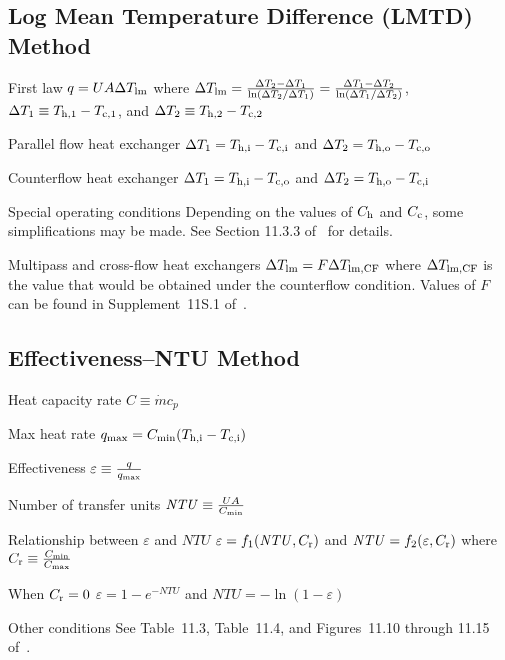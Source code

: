 \documentclass{article}
\begin{document}
\subsection{Log Mean Temperature Difference (LMTD) Method}
\label{sec:lmtd}

\begin{description*}
\item[First law]
  \(q = UA\Delta T_{\mathrm{lm}}\) where
  \(\Delta T_{\mathrm{lm}} = \frac{\Delta T_2 - \Delta T_1}{\ln(\Delta T_2 / \Delta T_1)}
  = \frac{\Delta T_1 - \Delta T_2}{\ln(\Delta T_1 / \Delta T_2)}\),
  \(\Delta T_1 \equiv T_{\mathrm{h},1} - T_{\mathrm{c},1}\), and
  \(\Delta T_2 \equiv T_{\mathrm{h},2} - T_{\mathrm{c},2}\)
\item[Parallel flow heat exchanger]
  \(\Delta T_1 = T_{\mathrm{h,i}} - T_{\mathrm{c,i}}\) and
  \(\Delta T_2 = T_{\mathrm{h,o}} - T_{\mathrm{c,o}}\)
\item[Counterflow heat exchanger]
  \(\Delta T_1 = T_{\mathrm{h,i}} - T_{\mathrm{c,o}}\) and
  \(\Delta T_2 = T_{\mathrm{h,o}} - T_{\mathrm{c,i}}\)
\item[Special operating conditions] Depending on the values of $C_{\mathrm{h}}$ and $C_{\mathrm{c}}$,
  some simplifications may be made. See Section 11.3.3 of~\cite{hamt} for details.
\item[Multipass and cross-flow heat exchangers]
  \(\Delta T_{\mathrm{lm}} = F \Delta T_{\mathrm{lm,CF}}\) where $\Delta T_{\mathrm{lm,CF}}$ is the value
  that would be obtained under the counterflow condition. Values of $F$ can be found in
  Supplement~11S.1 of~\cite{hamt}.
\end{description*}

\subsection{Effectiveness--NTU Method}
\label{sec:eff-ntu}

\begin{description*}
\item[Heat capacity rate]
  \(C \equiv \dot{m} c_p\)
\item[Max heat rate]
  \(q_{\mathrm{max}} = C_{\mathrm{min}}(T_{\mathrm{h,i}} - T_{\mathrm{c,i}})\)
\item[Effectiveness]
  \(\varepsilon \equiv \frac{q}{q_{\mathrm{max}}}\)
\item[Number of transfer units]
  \(\mathit{NTU} \equiv \frac{UA}{C_{\mathrm{min}}}\)
\item[Relationship between $\varepsilon$ and $\mathit{NTU}$]
  \(\varepsilon = f_1(\mathit{NTU}, C_{\mathrm{r}})\) and
  \(\mathit{NTU} = f_2(\varepsilon, C_{\mathrm{r}})\) where
  \(C_{\mathrm{r}} \equiv \frac{C_{\mathrm{min}}}{C_{\mathrm{max}}}\)
  \begin{description*}
  \item[When \(C_{\mathrm{r}} = 0\)]
    \(\varepsilon = 1 - e^{-\mathit{NTU}}\) and \(\mathit{NTU} = -\ln(1 - \varepsilon)\)
  \item[Other conditions] See Table~11.3, Table~11.4, and Figures~11.10 through 11.15 of~\cite{hamt}.
  \end{description*}
\end{description*}
\end{document}
